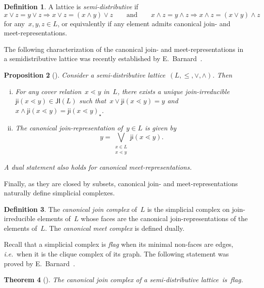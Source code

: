 \documentclass{amsart}
\newtheorem{theorem}{Theorem}[part]
\newtheorem{proposition}[theorem]{Proposition}
\theoremstyle{definition}
\newtheorem{definition}[theorem]{Definition}
\newcommand{\ie}{\textit{i.e.}~} %
\newcommand{\darkblue}{\color{darkblue}} %
\newcommand{\defn}[1]{\textsl{\darkblue #1}} %
\newcommand{\meet}{\wedge} %
\newcommand{\join}{\vee} %
\newcommand{\bigJoin}{\bigvee} %
\newcommand{\JI}{\mathsf{JI}} %
\newcommand{\ji}{\mathsf{ji}} %
\begin{document}
\begin{definition}
A lattice is \defn{semi-distributive} if
\[
x \join z = y \join z \Longrightarrow x \join z = (x \meet y) \join z
\qquad\text{and}\qquad
x \meet z = y \meet z \Longrightarrow x \meet z = (x \join y) \meet z
\]
for any~$x, y, z \in L$, or equivalently if any element admits canonical join- and meet-representations.
\end{definition}

The following characterization of the canonical join- and meet-representations in a semidistributive lattice was recently established by E.~Barnard~\cite{Barnard}.

\begin{proposition}[{\cite[Lem.~3.3]{Barnard}}]
\label{prop:canonicalJoinRepresentation}
Consider a semi-distributive lattice~$(L,\le,\join,\meet)$. Then
\begin{enumerate}[(i)]
\item For any cover relation~$x \lessdot y$ in~$L$, there exists a unique join-irreducible~$\ji(x \lessdot y) \in \JI(L)$ such that~$x \join \ji(x \lessdot y) = y$ and~$x \meet \ji(x \lessdot y) = \ji(x \lessdot y)_\star$.
\item The canonical join-representation of~$y \in L$ is given by
\[
y = \bigJoin_{\substack{x \in L \\ x \lessdot y}} \ji(x \lessdot y).
\]
\end{enumerate}
A dual statement also holds for canonical meet-representations.
\end{proposition}

Finally, as they are closed by subsets, canonical join- and meet-representations naturally define simplicial complexes.

\begin{definition}
The \defn{canonical join complex} of~$L$ is the simplicial complex on join-irreducible elements of~$L$ whose faces are the canonical join-representations of the elements of~$L$.
The \defn{canonical meet complex} is defined dually.
\end{definition}

Recall that a simplicial complex is \defn{flag} when its minimal non-faces are edges, \ie when it is the clique complex of its graph.
The following statement was proved by E.~Barnard~\cite{Barnard}.

\begin{theorem}[{\cite[Thm.~1.1]{Barnard}}]
The canonical join complex of a semi-distributive lattice~is~flag.
\end{theorem}
\end{document}
